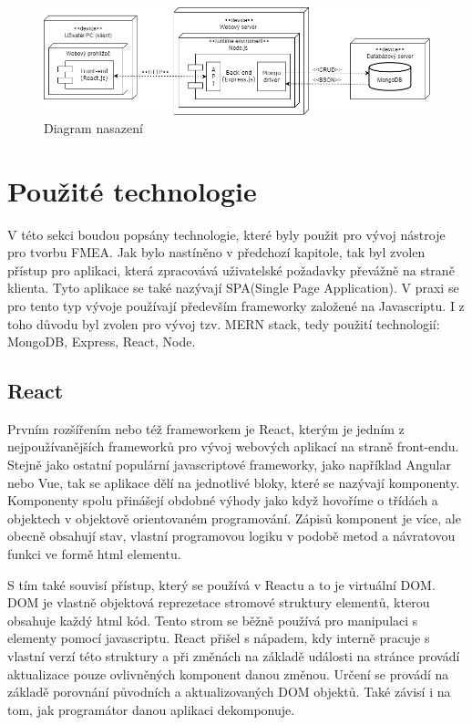\begin{figure}[h]
\centering
	\includegraphics[width=1.0\textwidth]{Figures/deploymentDiagram.png}
	\caption{Diagram nasazení}
	\label{fig:architecture}
\end{figure}

\section{Použité technologie}
V této sekci boudou popsány technologie, které byly použit pro vývoj nástroje pro tvorbu FMEA. Jak bylo nastíněno v předchozí kapitole, tak byl zvolen přístup pro aplikaci, která zpracovává uživatelské požadavky převážně na straně klienta. Tyto aplikace se také nazývají SPA(Single Page Application). V praxi se pro tento typ vývoje používají především frameworky založené na Javascriptu. I z toho důvodu byl zvolen pro vývoj tzv. MERN stack, tedy použití technologií: MongoDB, Express, React, Node. 
\subsection{React}
Prvním rozšířením nebo též frameworkem je React, kterým je jedním z nejpoužívanějších frameworků pro vývoj webových aplikací na straně front-endu. Stejně jako ostatní populární javascriptové frameworky, jako například Angular nebo Vue, tak se aplikace dělí na jednotlivé bloky, které se nazývají komponenty. Komponenty spolu přinášejí obdobné výhody jako když hovoříme o třídách a objektech v objektově orientovaném programování. Zápisů komponent je více, ale obecně obsahují stav, vlastní programovou logiku v podobě metod a návratovou funkci ve formě html elementu.  

S tím také souvisí přístup, který se používá v Reactu a to je virtuální DOM. DOM je vlastně objektová reprezetace stromové struktury elementů, kterou obsahuje každý html kód. Tento strom se běžně používá pro manipulaci s elementy pomocí javascriptu. React přišel s nápadem, kdy interně pracuje s vlastní verzí této struktury a při změnách na základě události na stránce provádí aktualizace pouze ovlivněných komponent danou změnou. Určení se provádí na základě porovnání původních a aktualizovaných DOM objektů. Také závisí i na tom, jak programátor danou aplikaci dekomponuje. 

